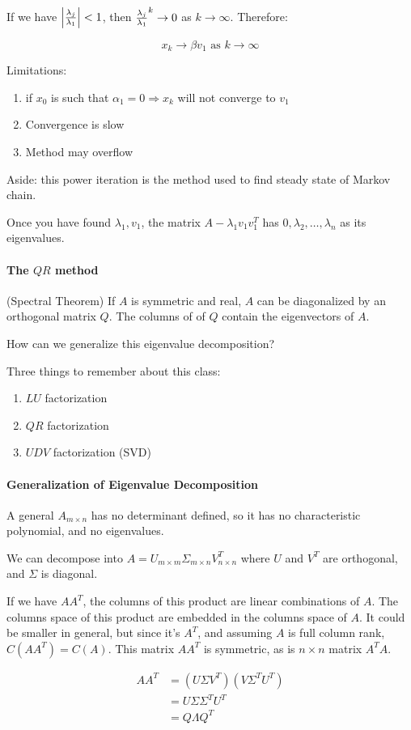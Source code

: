 If we have $\left|\lambda_j \over \lambda_1\right| < 1$, then ${\lambda_j \over \lambda_1}^k \rightarrow 0$ as $k \rightarrow \infty$. Therefore:

\[
  x_k \rightarrow \beta v_1 \text{ as } k \rightarrow \infty
\]

Limitations:
\begin{enumerate}
  \item if $x_0$ is such that $\alpha_1 = 0 \Rightarrow x_k$ will not converge to $v_1$
  \item Convergence is slow
  \item Method may overflow
\end{enumerate}

Aside: this power iteration is the method used to find steady state of Markov chain.

Once you have found $\lambda_1, v_1$, the matrix $A - \lambda_1 v_1 v_1^T$ has $0, \lambda_2, \dots, \lambda_n$ as its eigenvalues.

\paragraph{The $QR$ method} (Spectral Theorem) If $A$ is symmetric and real, $A$ can be diagonalized by an orthogonal matrix $Q$. The columns of of $Q$ contain the eigenvectors of $A$.

How can we generalize this eigenvalue decomposition?

Three things to remember about this class:

\begin{enumerate}
  \item $LU$ factorization
  \item $QR$ factorization
  \item $UDV$ factorization (SVD)
\end{enumerate}

\paragraph{Generalization of Eigenvalue Decomposition}

A general $A_{m \times n}$ has no determinant defined, so it has no characteristic polynomial, and no eigenvalues.

We can decompose into $A = U_{m \times m} \Sigma_{m \times n} V^T_{n \times n}$ where $U$ and $V^T$ are orthogonal, and $\Sigma$ is diagonal.

If we have $AA^T$, the columns of this product are linear combinations of $A$. The columns space of this product are embedded in the columns space of $A$. It could be smaller in general, but since it's $A^T$, and assuming $A$ is full column rank, $C(AA^T) = C(A)$. This matrix $A A^T$ is symmetric, as is $n \times n$ matrix $A^T A$.

\begin{align*}
  A A^T &= (U \Sigma V^T) (V \Sigma^T U^T) \\
  &= U \Sigma \Sigma^T U^T \\
  &= Q \Lambda Q^T
\end{align*}
